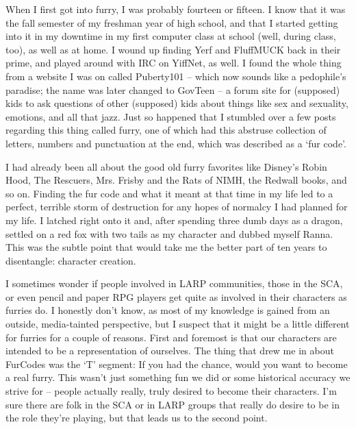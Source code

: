 
When I first got into furry, I was probably fourteen or fifteen.  I know that it was the fall semester of my freshman year of high school, and that I started getting into it in my downtime in my first computer class at school (well, during class, too), as well as at home.  I wound up finding Yerf and FluffMUCK back in their prime, and played around with IRC on YiffNet, as well.  I found the whole thing from a website I was on called Puberty101 -- which now sounds like a pedophile's paradise; the name was later changed to GovTeen -- a forum site for (supposed) kids to ask questions of other (supposed) kids about things like sex and sexuality, emotions, and all that jazz.  Just so happened that I stumbled over a few posts regarding this thing called furry, one of which had this abstruse collection of letters, numbers and punctuation at the end, which was described as a `fur code'.

I had already been all about the good old furry favorites like Disney's Robin Hood, The Rescuers, Mrs. Frisby and the Rats of NIMH, the Redwall books, and so on.  Finding the fur code and what it meant at that time in my life led to a perfect, terrible storm of destruction for any hopes of normalcy I had planned for my life.  I latched right onto it and, after spending three dumb days as a dragon, settled on a red fox with two tails as my character and dubbed myself Ranna.  This was the subtle point that would take me the better part of ten years to disentangle: character creation.

I sometimes wonder if people involved in LARP communities, those in the SCA, or even pencil and paper RPG players get quite as involved in their characters as furries do.  I honestly don't know, as most of my knowledge is gained from an outside, media-tainted perspective, but I suspect that it might be a little different for furries for a couple of reasons.  First and foremost is that our characters are intended to be a representation of ourselves.  The thing that drew me in about FurCodes was the `T' segment: If you had the chance, would you want to become a real furry.  This wasn't just something fun we did or some historical accuracy we strive for -- people actually really, truly desired to become their characters.  I'm sure there are folk in the SCA or in LARP groups that really do desire to be in the role they're playing, but that leads us to the second point.


